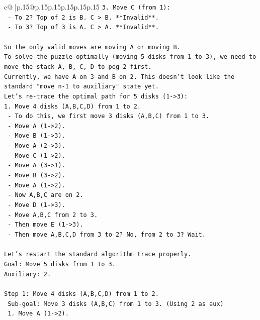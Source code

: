 \documentclass{article}
\begin{document}
{\begin{supertabular}{c@{$\;$}|p{.15\linewidth}@{}p{.15\linewidth}p{.15\linewidth}p{.15\linewidth}p{.15\linewidth}p{.15\linewidth}}
{{{\texttt{3. Move C (from 1):} \\
\texttt{   {-} To 2? Top of 2 is B. C > B. **Invalid**.} \\
\texttt{   {-} To 3? Top of 3 is A. C > A. **Invalid**.} \\
\\ 
\texttt{So the only valid moves are moving A or moving B.} \\
\texttt{To solve the puzzle optimally (moving 5 disks from 1 to 3), we need to move the stack A, B, C, D to peg 2 first.} \\
\texttt{Currently, we have A on 3 and B on 2. This doesn't look like the standard "move n{-}1 to auxiliary" state yet.} \\
\texttt{Let's re{-}trace the optimal path for 5 disks (1{-}>3):} \\
\texttt{1. Move 4 disks (A,B,C,D) from 1 to 2.} \\
\texttt{   {-} To do this, we first move 3 disks (A,B,C) from 1 to 3.} \\
\texttt{     {-} Move A (1{-}>2).} \\
\texttt{     {-} Move B (1{-}>3).} \\
\texttt{     {-} Move A (2{-}>3).} \\
\texttt{     {-} Move C (1{-}>2).} \\
\texttt{     {-} Move A (3{-}>1).} \\
\texttt{     {-} Move B (3{-}>2).} \\
\texttt{     {-} Move A (1{-}>2).} \\
\texttt{     {-} Now A,B,C are on 2.} \\
\texttt{     {-} Move D (1{-}>3).} \\
\texttt{     {-} Move A,B,C from 2 to 3.} \\
\texttt{   {-} Then move E (1{-}>3).} \\
\texttt{   {-} Then move A,B,C,D from 3 to 2? No, from 2 to 3? Wait.} \\
\\ 
\texttt{Let's restart the standard algorithm trace properly.} \\
\texttt{Goal: Move 5 disks from 1 to 3.} \\
\texttt{Auxiliary: 2.} \\
\\ 
\texttt{Step 1: Move 4 disks (A,B,C,D) from 1 to 2.} \\
\texttt{  Sub{-}goal: Move 3 disks (A,B,C) from 1 to 3. (Using 2 as aux)} \\
\texttt{    1. Move A (1{-}>2).} \\
}}}
\end{supertabular}}
\end{document}
